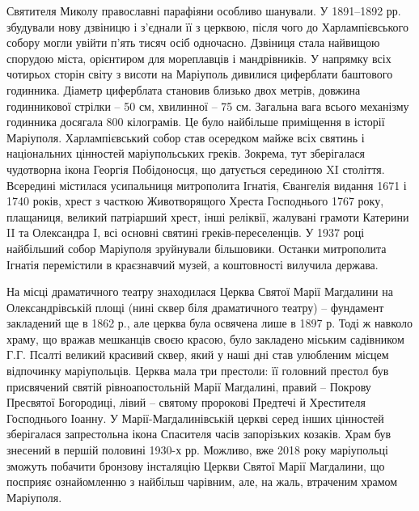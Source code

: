 Святителя Миколу православні парафіяни особливо шанували. У 1891–1892 рр.
збудували нову дзвіницю і з'єднали її з церквою, після чого до Харлампієвського
собору могли увійти п'ять тисяч осіб одночасно. Дзвіниця стала найвищою
спорудою міста, орієнтиром для мореплавців і мандрівників. У напрямку всіх
чотирьох сторін світу з висоти на Маріуполь дивилися циферблати баштового
годинника. Діаметр циферблата становив близько двох метрів, довжина
годинникової стрілки – 50 см, хвилинної – 75 см. Загальна вага всього механізму
годинника досягала 800 кілограмів. Це було найбільше приміщення в історії
Маріуполя. Харлампієвський собор став осередком майже всіх святинь і
національних цінностей маріупольських греків. Зокрема, тут зберігалася
чудотворна ікона Георгія Побідоносця, що датується серединою XI століття.
Всередині містилася усипальниця митрополита Ігнатія, Євангелія видання 1671 і
1740 років, хрест з часткою Животворящого Хреста Господнього 1767 року,
плащаниця, великий патріарший хрест, інші реліквії, жалувані грамоти Катерини
II та Олександра I, всі основні святині греків-переселенців. У 1937 році
найбільший собор Маріуполя зруйнували більшовики. Останки митрополита Ігнатія
перемістили в краєзнавчий музей, а коштовності вилучила держава.


На місці драматичного театру знаходилася Церква Святої Марії Магдалини на
Олександрівській площі (нині сквер біля драматичного театру) – фундамент
закладений ще в 1862 р., але церква була освячена лише в 1897 р. Тоді ж навколо
храму, що вражав мешканців своєю красою, було закладено міським садівником Г.Г.
Псалті великий красивий сквер, який у наші дні став улюбленим місцем відпочинку
маріупольців. Церква мала три престоли: її головний престол був присвячений
святій рівноапостольній Марії Магдалині, правий – Покрову Пресвятої Богородиці,
лівий – святому пророкові Предтечі й Хрестителя Господнього Іоанну. У
Марії-Магдалинівській церкві серед інших цінностей зберігалася запрестольна
ікона Спасителя часів запорізьких козаків. Храм був знесений в першій половині
1930-х рр.   Можливо, вже 2018 року маріупольці зможуть побачити бронзову
інсталяцію Церкви Святої Марії Магдалини, що посприяє ознайомленню з найбільш
чарівним, але, на жаль, втраченим храмом Маріуполя.


